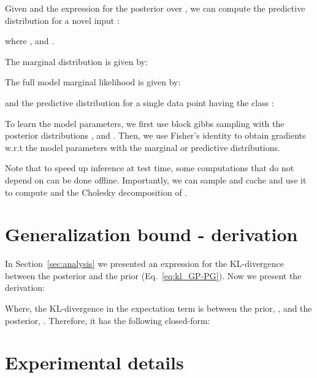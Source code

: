 \documentclass{article}
\def\Secref#1{Section~\ref{#1}}
\def\Eqref#1{Eq.~\ref{#1}}
\begin{document}
Given  and the expression for the posterior over , we can compute the predictive distribution for a novel input :

where , and .

The marginal distribution is given by:


The full model marginal likelihood is given by:


and the predictive distribution for a single data point  having the class :


To learn the model parameters, we first use block gibbs sampling with the posterior distributions , and . Then, we use Fisher's identity \cite{douc2014nonlinear} to obtain gradients w.r.t the model parameters with the marginal or predictive distributions.

Note that to speed up inference at test time, some computations that do not depend on  can be done offline. Importantly, we can sample and cache  and use it to compute  and the Cholesky decomposition of .

\section{Generalization bound - derivation} \label{sec_app:generalization_bound}
In \Secref{sec:analysis} we presented an expression for the KL-divergence between the posterior and the prior (\Eqref{eq:kl_GP-PG}). Now we present the derivation:


Where, the KL-divergence in the expectation term is between the prior, , and the posterior, . Therefore, it has the following closed-form:






\section{Experimental details} \label{sec:exp_details}
\end{document}
